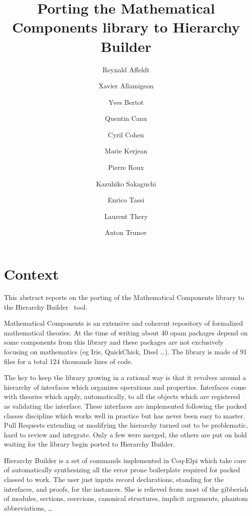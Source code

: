 \documentclass{easychair}
\title{Porting the Mathematical Components library to Hierarchy Builder}
\author{
  Reynald Affeldt\inst{3}
  \and
  Xavier Allamigeon\inst{4}
  \and
  Yves Bertot\inst{1}
  \and
  Quentin Canu
  \and
  Cyril Cohen\inst{1}
  \and
  Marie Kerjean
  \and
  Pierre Roux
  \and
  Kazuhiko Sakaguchi\inst{2}
  \and
  Enrico Tassi\inst{1}
  \and
  Laurent Thery\inst{1}
  \and
  Anton Trunov
}
\institute{
  Inria, Universit\'e c\^ote d'Azur
\and
   Tsukuba University
\and
   AIST
\and
   Inria, CMAP, CNRS, Ecole Polytechnique, Institut Polytechnique de Paris
 }
\begin{document}
\maketitle



%
%

\section{Context}
\label{sect:introduction}

This abstract reports on the porting of the Mathematical Components library
to the Hierarchy Builder~\cite{cohen_et_al:LIPIcs:2020:12356} tool.

Mathematical Components is an extensive and coherent repository of formalized
mathematical theories. At the time of writing about 40 opam packages depend
on some components from this library and these packages are not exclusively
focusing on mathematics (eg Iris, QuickChick, Disel \ldots). 
The library is made of 91 files for a total 124 thousands lines of code.

The key to keep the library growing in a rational way is that it revolves
around a hierarchy of interfaces which organizes operations and properties.
Interfaces come with theories which apply, automatically, to all the objects
which are registered as validating the interface. These interfaces are
implemented following the packed classes discipline which works well in practice
but has never been easy to master. Pull Requests extending or modifying the
hierarchy turned out to be problematic, hard to review and integrate. Only
a few were merged, the others are put on hold waiting for the library begin
ported to Hierarchy Builder.

Hierarchy Builder is a set of commands implemented in Coq-Elpi which take
care of automatically synthesizing all the error prone boilerplate required for
packed classed to work. The user just inputs record declarations,
standing for the interfaces, and proofs, for the instances. She is relieved from
most of the gibberish of modules, sections, coercions, canonical
structures, implicit arguments, phantom abbreviations, \ldots
 
\end{document}
